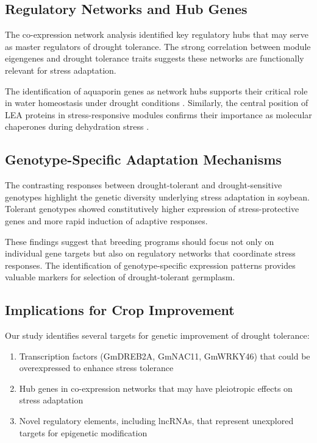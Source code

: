 \documentclass[11pt,a4paper]{article}
\begin{document}
\subsection{Regulatory Networks and Hub Genes}

The co-expression network analysis identified key regulatory hubs that may serve as master regulators of drought tolerance. The strong correlation between module eigengenes and drought tolerance traits suggests these networks are functionally relevant for stress adaptation.

The identification of aquaporin genes as network hubs supports their critical role in water homeostasis under drought conditions \citep{Maurel2015}. Similarly, the central position of LEA proteins in stress-responsive modules confirms their importance as molecular chaperones during dehydration stress \citep{Hincha2011}.

\subsection{Genotype-Specific Adaptation Mechanisms}

The contrasting responses between drought-tolerant and drought-sensitive genotypes highlight the genetic diversity underlying stress adaptation in soybean. Tolerant genotypes showed constitutively higher expression of stress-protective genes and more rapid induction of adaptive responses.

These findings suggest that breeding programs should focus not only on individual gene targets but also on regulatory networks that coordinate stress responses. The identification of genotype-specific expression patterns provides valuable markers for selection of drought-tolerant germplasm.

\subsection{Implications for Crop Improvement}

Our study identifies several targets for genetic improvement of drought tolerance:

\begin{enumerate}
\item Transcription factors (GmDREB2A, GmNAC11, GmWRKY46) that could be overexpressed to enhance stress tolerance
\item Hub genes in co-expression networks that may have pleiotropic effects on stress adaptation
\item Novel regulatory elements, including lncRNAs, that represent unexplored targets for epigenetic modification
\end{enumerate}
\end{document}
